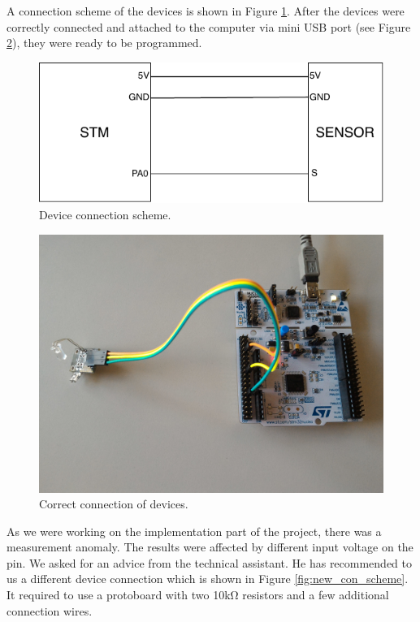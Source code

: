 \documentclass[11pt,a4paper]{article}
\begin{document}
\newpage

A connection scheme of the devices is shown in Figure \ref{fig:old_con_scheme}. After the devices were correctly connected and attached to the computer via mini USB port (see Figure \ref{fig:connection}), they were ready to be programmed.

\begin{figure}[H]
    \centering
    \includegraphics[scale=1.4]{img/old_con_scheme.pdf}
    \caption{Device connection scheme.}
    \label{fig:old_con_scheme}
\end{figure}

\begin{figure}[H]
    \centering
    \includegraphics[scale=0.1]{img/setup1.jpg}
    \caption{Correct connection of devices.}
    \label{fig:connection}
\end{figure}

\newpage

As we were working on the implementation part of the project, there was a measurement anomaly. The results were affected by different input voltage on the pin. We asked for an advice from the technical assistant. He has recommended to us a different device connection which is shown in Figure \ref{fig:new_con_scheme}. It required to use a protoboard with two 10k\si{\ohm} resistors and a few additional connection wires.
\end{document}
